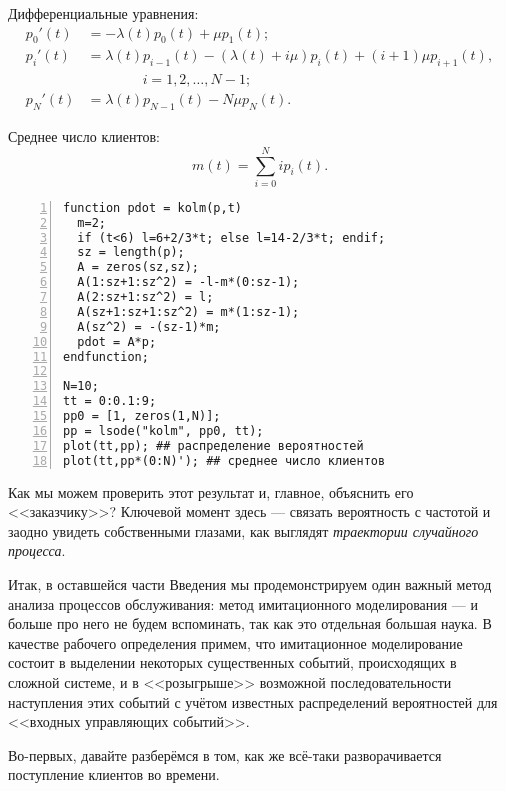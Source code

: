 \documentclass[14pt]{extarticle}
\theoremstyle{theorem}
\theoremstyle{remark}
\begin{document}
Дифференциальные уравнения: 
\begin{align*}
  p_0'(t) & = -\lambda(t)p_0(t)+\mu p_1(t);\\
  p_i'(t) & = \lambda(t)p_{i-1}(t)-(\lambda(t)+i\mu)p_i(t)+(i+1)\mu
  p_{i+1}(t),\\ & \qquad \qquad i=1, 2, \ldots, N-1;\\
  p_N'(t) & = \lambda(t)p_{N-1}(t)-N\mu p_N(t).
\end{align*}

Среднее число клиентов:
\[
m(t)=\sum_{i=0}^N i p_i(t).
\]
\begin{Verbatim}[frame=single,xleftmargin=2em,numbers=left]
function pdot = kolm(p,t)
  m=2;
  if (t<6) l=6+2/3*t; else l=14-2/3*t; endif;
  sz = length(p);
  A = zeros(sz,sz);
  A(1:sz+1:sz^2) = -l-m*(0:sz-1);
  A(2:sz+1:sz^2) = l;
  A(sz+1:sz+1:sz^2) = m*(1:sz-1);
  A(sz^2) = -(sz-1)*m;
  pdot = A*p;
endfunction;

N=10;
tt = 0:0.1:9;
pp0 = [1, zeros(1,N)];
pp = lsode("kolm", pp0, tt);
plot(tt,pp); ## распределение вероятностей
plot(tt,pp*(0:N)'); ## среднее число клиентов
\end{Verbatim}


Как мы можем проверить этот результат и, главное, объяснить его <<заказчику>>? 
Ключевой момент здесь --- связать вероятность с частотой и заодно увидеть
собственными глазами, как выглядят \emph{траектории случайного процесса}.

Итак, в оставшейся части Введения мы продемонстрируем один важный метод анализа
процессов обслуживания: метод имитационного моделирования --- и больше про него
не будем вспоминать, так как это отдельная большая наука. В качестве рабочего
определения примем, что имитационное моделирование состоит в выделении некоторых
существенных событий, происходящих в сложной системе, и в <<розыгрыше>>
возможной последовательности наступления этих событий с учётом известных
распределений вероятностей для <<входных управляющих событий>>. 

Во-первых, давайте разберёмся в том, как же всё-таки разворачивается поступление
клиентов во времени.
\end{document}
